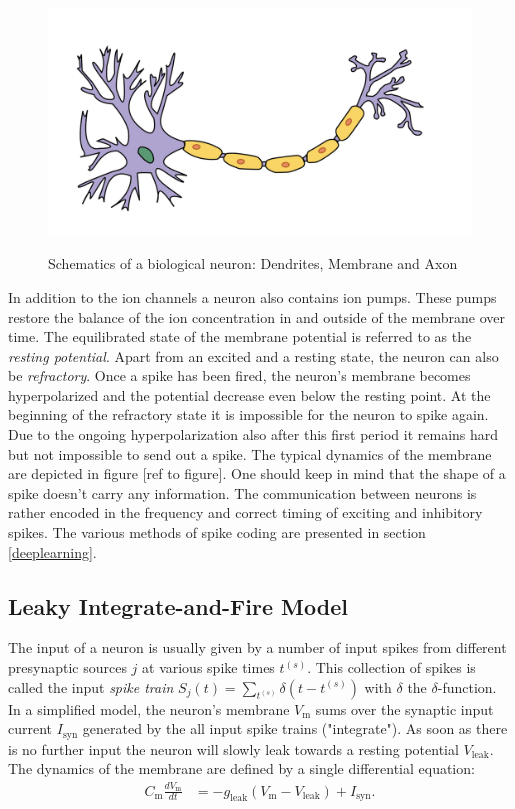 \begin{figure}
	\includegraphics[width=\linewidth]{figures/neuron_model.png}
	\label{biosynapse}
	\caption{Schematics of a biological neuron: Dendrites, Membrane and Axon}
\end{figure}


In addition to the ion channels a neuron also contains ion pumps. These pumps restore the balance of the ion concentration in and outside of the membrane over time. The equilibrated state of the membrane potential is referred to as the \textit{resting potential}. Apart from an excited and a resting state, the neuron can also be \textit{refractory}. Once a spike has been fired, the neuron's membrane becomes hyperpolarized and the potential decrease even below the resting point. At the beginning of the refractory state it is impossible for the neuron to spike again. Due to the ongoing hyperpolarization also after this first period it remains hard but not impossible to send out a spike. The typical dynamics of the membrane are depicted in figure [ref to figure]. One should keep in mind that the shape of a spike doesn't carry any information.  The communication between neurons is rather encoded in the frequency and correct timing of exciting and inhibitory spikes. The various methods of spike coding are presented in section \ref{deeplearning}. 

\subsection{Leaky Integrate-and-Fire Model}

The input of a neuron is usually given by a number of input spikes from different presynaptic sources $j$ at various spike times $t^{(s)}$. This collection of spikes is called the input \textit{spike train} $S_j(t) = \sum_{t^{(s)}} \delta(t - t^{(s)})$ with $\delta$ the $\delta$-function. In a simplified model, the neuron's membrane $V_{\text{m}}$ sums over the synaptic input current $I_{\text{syn}}$ generated by the all input spike trains ("integrate"). As soon as there is no further input the neuron will slowly leak towards a resting potential $V_\text{leak}$. The dynamics of the membrane are defined by a single differential equation:
\begin{align}
C_{\text{m}} \frac{dV_{\text{m}}}{dt} &= -g_{\text{leak}} (V_{\text{m}} - V_{\text{leak}}) + I_{\text{syn}}.
\end{align}


